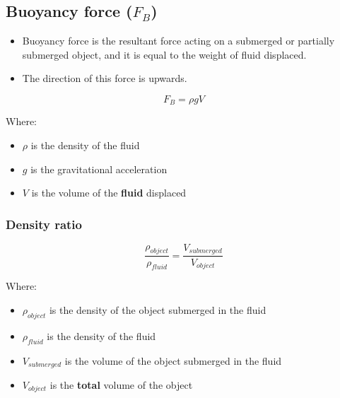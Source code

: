 \documentclass[11pt]{article}
\begin{document}
\newpage

\subsection{Buoyancy force (\(F_B\))}
\label{sec:orge535c24}
\begin{itemize}
\item Buoyancy force is the resultant force acting on a submerged or partially submerged object, and it is equal to the weight of fluid displaced.
\item The direction of this force is upwards.
\end{itemize}

\[F_B = \rho g V\]

Where:
\begin{itemize}
\item \(\rho\) is the density of the fluid
\item \(g\) is the gravitational acceleration
\item \(V\) is the volume of the \textbf{fluid} displaced
\end{itemize}

\subsubsection{Density ratio}
\label{sec:org91926e0}
\[\frac{\rho_{object}}{\rho_{fluid}} = \frac{V_{submerged}}{V_{object}}\]

Where:
\begin{itemize}
\item \(\rho_{object}\) is the density of the object submerged in the fluid
\item \(\rho_{fluid}\) is the density of the fluid
\item \(V_{submerged}\) is the volume of the object submerged in the fluid
\item \(V_{object}\) is the \textbf{total} volume of the object
\end{itemize}

\newpage
\end{document}
